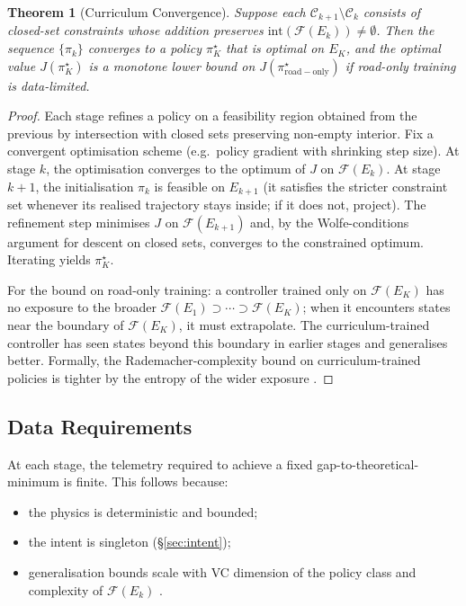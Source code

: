 \documentclass[11pt,twocolumn]{article}
\newtheorem{theorem}{Theorem}
\theoremstyle{definition}
\theoremstyle{remark}
\newcommand{\Feas}{\mathcal{F}}
\providecommand{\cC}{\mathcal{C}}
\begin{document}
\begin{theorem}[Curriculum Convergence]\label{thm:curriculum}
Suppose each $\cC_{k+1} \setminus \cC_k$ consists of closed-set constraints whose addition preserves $\mathrm{int}(\Feas(E_k)) \ne \emptyset$. Then the sequence $\{\pi_k\}$ converges to a policy $\pi_K^{\star}$ that is optimal on $E_K$, and the optimal value $J(\pi_K^{\star})$ is a monotone lower bound on $J(\pi_{\mathrm{road-only}}^{\star})$ if road-only training is data-limited.
\end{theorem}

\begin{proof}
Each stage refines a policy on a feasibility region obtained from the previous by intersection with closed sets preserving non-empty interior. Fix a convergent optimisation scheme (e.g.\ policy gradient with shrinking step size). At stage $k$, the optimisation converges to the optimum of $J$ on $\Feas(E_k)$. At stage $k+1$, the initialisation $\pi_k$ is feasible on $E_{k+1}$ (it satisfies the stricter constraint set whenever its realised trajectory stays inside; if it does not, project). The refinement step minimises $J$ on $\Feas(E_{k+1})$ and, by the Wolfe-conditions argument for descent on closed sets, converges to the constrained optimum. Iterating yields $\pi_K^{\star}$.

For the bound on road-only training: a controller trained only on $\Feas(E_K)$ has no exposure to the broader $\Feas(E_1) \supset \cdots \supset \Feas(E_K)$; when it encounters states near the boundary of $\Feas(E_K)$, it must extrapolate. The curriculum-trained controller has seen states beyond this boundary in earlier stages and generalises better. Formally, the Rademacher-complexity bound on curriculum-trained policies is tighter by the entropy of the wider exposure \cite{bartlett2002rademacher}.
\end{proof}

\subsection{Data Requirements}

At each stage, the telemetry required to achieve a fixed gap-to-theoretical-minimum is finite. This follows because:
\begin{itemize}[leftmargin=*,itemsep=2pt]
\item the physics is deterministic and bounded;
\item the intent is singleton (\S\ref{sec:intent});
\item generalisation bounds scale with VC dimension of the policy class and complexity of $\Feas(E_k)$ \cite{wasserman2013all,bartlett2002rademacher}.
\end{itemize}
\end{document}
